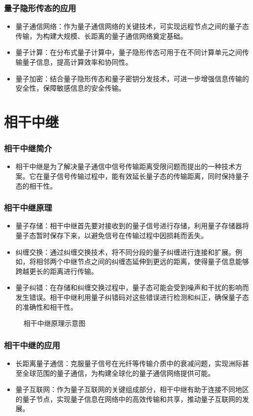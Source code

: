 \begin{frame}
    \frametitle{量子隐形传态的应用}
    \begin{itemize}
        \item 量子通信网络：作为量子通信网络的关键技术，可实现远程节点之间的量子态传输，为构建大规模、长距离的量子通信网络奠定基础。
        \item 量子计算：在分布式量子计算中，量子隐形传态可用于在不同计算单元之间传输量子信息，提高计算效率和协同性。
        \item 量子加密：结合量子隐形传态和量子密钥分发技术，可进一步增强信息传输的安全性，保障敏感信息的安全传输。
    \end{itemize}
\end{frame}

\section{相干中继}
\begin{frame}
    \frametitle{相干中继简介}
    \begin{itemize}
        \item 相干中继是为了解决量子通信中信号传输距离受限问题而提出的一种技术方案。它在量子信号传输过程中，能有效延长量子态的传输距离，同时保持量子态的相干性。
    \end{itemize}
\end{frame}

\begin{frame}
    \frametitle{相干中继原理}
    \begin{itemize}
        \item 量子存储：相干中继首先要对接收到的量子信号进行存储，利用量子存储器将量子态暂时保存下来，以避免信号在传输过程中因损耗而丢失。
        \item 纠缠交换：通过纠缠交换技术，将不同分段的量子纠缠进行连接和扩展。例如，将相邻两个中继节点之间的纠缠态延伸到更远的距离，使得量子信息能够跨越更长的距离进行传输。
        \item 量子纠错：在存储和纠缠交换过程中，量子态可能会受到噪声和干扰的影响而发生错误。相干中继利用量子纠错码对这些错误进行检测和纠正，确保量子态的准确性和相干性。
    \end{itemize}
    \begin{figure}
        \centering
        \caption{相干中继原理示意图}
    \end{figure}
\end{frame}

\begin{frame}
    \frametitle{相干中继的应用}
    \begin{itemize}
        \item 长距离量子通信：克服量子信号在光纤等传输介质中的衰减问题，实现洲际甚至全球范围的量子通信，为构建全球化的量子通信网络提供可能。
        \item 量子互联网：作为量子互联网的关键组成部分，相干中继有助于连接不同地区的量子节点，实现量子信息在网络中的高效传输和共享，推动量子互联网的发展。
    \end{itemize}
\end{frame}

